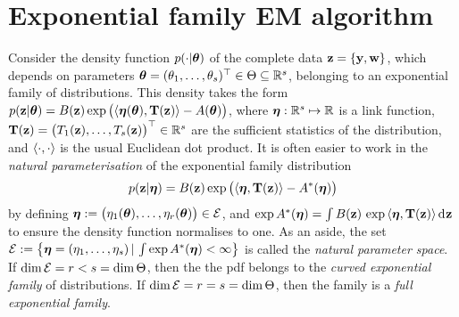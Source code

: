\section{Exponential family EM algorithm}
\label{apx:expem}

Consider the density function $p(\cdot|{\bm\theta})$ of the complete data ${\mathbf z} = \{{\mathbf y},{\mathbf w}\}$, which depends on parameters ${\bm\theta} = (\theta_1,\dots,\theta_s)^\top \in\Theta\subseteq\mathbb{R}^s$, belonging to an exponential family of distributions.
This density takes the form $p({\mathbf z}|{\bm\theta}) = B({\mathbf z}) \exp \big( \langle{\bm\eta}({\bm\theta}), {\mathbf T}({\mathbf z})\rangle -  A({\bm\theta}) \big)$, where ${\bm\eta}:\mathbb{R}^s \mapsto \mathbb{R}$ is a link function,  ${\mathbf T}({\mathbf z}) = \big(T_1({\mathbf z}),\dots,T_s({\mathbf z})\big)^\top \in \mathbb{R}^s$ are the sufficient statistics of the distribution, and $\langle\cdot,\cdot\rangle$ is the usual Euclidean dot product.
It is often easier to work in the \emph{natural parameterisation} of the exponential family distribution
\begin{align}\label{eq:pdfexpfamnat}
  p({\mathbf z}|{\bm\eta}) = B({\mathbf z}) \exp \big( \langle{\bm\eta}, {\mathbf T}({\mathbf z})\rangle -  A^*({\bm\eta}) \big)
\end{align}
by defining ${\bm\eta} := \big(\eta_1({\bm\theta}),\dots,\eta_r({\bm\theta})\big) \in {\mathcal E}$, and $\exp A^*({\bm\eta}) = \int B({\mathbf z}) \, \exp \, \langle{\bm\eta}, {\mathbf T}({\mathbf z})\rangle  \operatorname{d}\hspace{0.5pt}\! {\mathbf z}$ to ensure the density function normalises to one.
As an aside, the set ${\mathcal E} := \big\{ {\bm\eta} = (\eta_1,\dots,\eta_s) \,|\, \int  \exp A^*({\bm\eta}) < \infty \big\}$ is called the \emph{natural parameter space}.
If $\dim {\mathcal E} = r < s = \dim \Theta$, then the the pdf belongs to the \emph{curved exponential family} of distributions.
If $\dim {\mathcal E} = r = s = \dim \Theta$, then the family is a \emph{full exponential family}.

